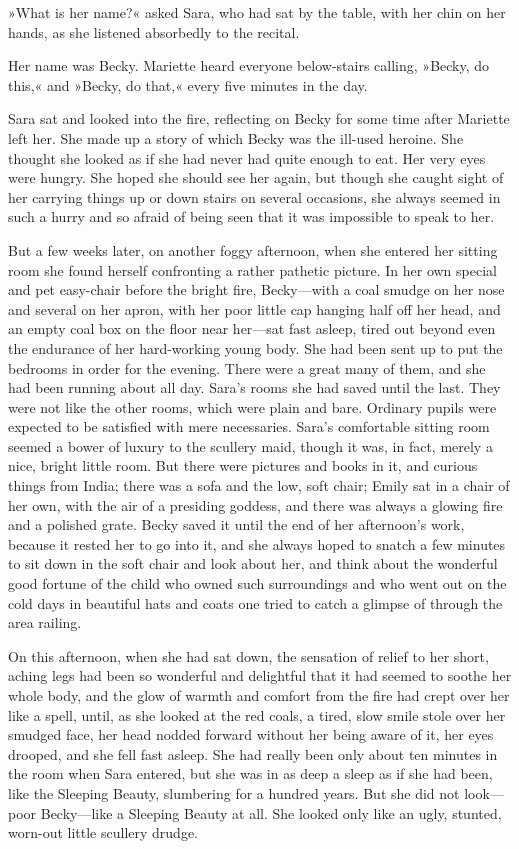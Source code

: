 »What is her name?« asked Sara, who had sat by the table, with her chin on her hands, as she listened absorbedly to the recital.

Her name was Becky. Mariette heard everyone below-stairs calling, »Becky, do this,« and »Becky, do that,« every five minutes in the day.

Sara sat and looked into the fire, reflecting on Becky for some time after Mariette left her. She made up a story of which Becky was the ill-used heroine. She thought she looked as if she had never had quite enough to eat. Her very eyes were hungry. She hoped she should see her again, but though she caught sight of her carrying things up or down stairs on several occasions, she always seemed in such a hurry and so afraid of being seen that it was impossible to speak to her.

But a few weeks later, on another foggy afternoon, when she entered her sitting room she found herself confronting a rather pathetic picture. In her own special and pet easy-chair before the bright fire, Becky—with a coal smudge on her nose and several on her apron, with her poor little cap hanging half off her head, and an empty coal box on the floor near her—sat fast asleep, tired out beyond even the endurance of her hard-working young body. She had been sent up to put the bedrooms in order for the evening. There were a great many of them, and she had been running about all day. Sara's rooms she had saved until the last. They were not like the other rooms, which were plain and bare. Ordinary pupils were expected to be satisfied with mere necessaries. Sara's comfortable sitting room seemed a bower of luxury to the scullery maid, though it was, in fact, merely a nice, bright little room. But there were pictures and books in it, and curious things from India; there was a sofa and the low, soft chair; Emily sat in a chair of her own, with the air of a presiding goddess, and there was always a glowing fire and a polished grate. Becky saved it until the end of her afternoon's work, because it rested her to go into it, and she always hoped to snatch a few minutes to sit down in the soft chair and look about her, and think about the wonderful good fortune of the child who owned such surroundings and who went out on the cold days in beautiful hats and coats one tried to catch a glimpse of through the area railing.

On this afternoon, when she had sat down, the sensation of relief to her short, aching legs had been so wonderful and delightful that it had seemed to soothe her whole body, and the glow of warmth and comfort from the fire had crept over her like a spell, until, as she looked at the red coals, a tired, slow smile stole over her smudged face, her head nodded forward without her being aware of it, her eyes drooped, and she fell fast asleep. She had really been only about ten minutes in the room when Sara entered, but she was in as deep a sleep as if she had been, like the Sleeping Beauty, slumbering for a hundred years. But she did not look—poor Becky—like a Sleeping Beauty at all. She looked only like an ugly, stunted, worn-out little scullery drudge.

